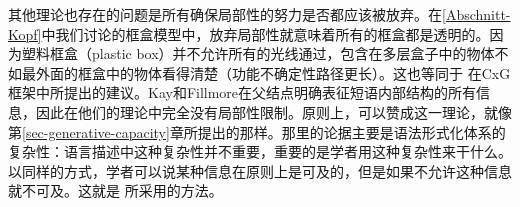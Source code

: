其他理论也存在的问题是所有确保局部性的努力是否都应该被放弃。在\ref{Abschnitt-Kopf}中我们讨论的框盒模型中，放弃局部性就意味着所有的框盒都是透明的。因为塑料框盒（plastic box）并不允许所有的光线通过，包含在多层盒子中的物体不如最外面的框盒中的物体看得清楚（功能不确定性路径更长）。这也等同于 \citet{KF99a}在CxG\indexcxgc 框架中所提出的建议。Kay和Fillmore在父结点明确表征短语内部结构的所有信息，因此在他们的理论中完全没有局部性限制。原则上，可以赞成这一理论，就像第\ref{sec-generative-capacity}章所提出的那样。那里的论据主要是语法形式化体系的复杂性：语言描述中这种复杂性并不重要，重要的是学者用这种复杂性来干什么。以同样的方式，学者可以说某种信息在原则上是可及的，但是如果不允许这种信息就不可及。这就是 \citet[--145]{ps}所采用的方法。

